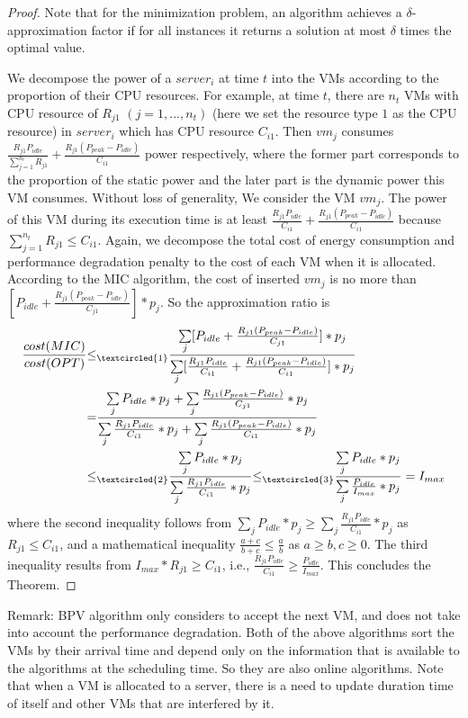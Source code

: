 \documentclass[10pt,journal]{IEEEtran}
\begin{document}
\begin{proof}
Note that for the minimization problem, an algorithm achieves a $\delta$-approximation factor if for all instances it returns a solution at most $\delta$ times the optimal value.

We decompose the power of a $server_i$ at time $t$ into the VMs according to the proportion of their CPU resources. For example, at time $t$, there are $n_t$ VMs with CPU resource of $R_{j1}$ $(j=1,...,n_t)$ (here we set the resource type $1$ as the CPU resource) in $server_i$ which has CPU resource $C_{i1}$. Then $vm_j$ consumes $\frac{R_{j1}P_{idle}}{\sum_{j=1}^{n_t}R_{j1}}+\frac{R_{j1}(P_{peak}-P_{idle})}{C_{i1}}$ power respectively, where the former part corresponds to the proportion of the static power and the later part is the dynamic power this VM consumes. Without loss of generality, We consider the VM $vm_j$. The power of this VM during its execution time is at least $\frac{R_{j1}P_{idle}}{C_{i1}}+\frac{R_{j1}(P_{peak}-P_{idle})}{C_{i1}}$ because $\sum_{j=1}^{n_t}R_{j1}{\leq}C_{i1}$. Again, we decompose the total cost of energy consumption and performance degradation penalty to the cost of each VM when it is allocated. According to the MIC algorithm, the cost of inserted $vm_j$ is no more than $[P_{idle}+\frac{R_{j1}(P_{peak}-P_{idle})}{C_{j1}}]*p_j$. So the approximation ratio is
\begin{equation*}
\begin{split}
\frac{cost(MIC)}{cost(OPT)}&{{\leq}_{\textcircled{1}}}\frac{\sum\limits_{j}[P_{idle}+\frac{R_{j1}(P_{peak}-P_{idle})}{C_{j1}}]*p_j}{\sum\limits_{j}[\frac{R_{j1}P_{idle}}{C_{i1}}+\frac{R_{j1}(P_{peak}-P_{idle})}{C_{i1}}]*p_j}\\
&{=}\frac{\sum\limits_{j}P_{idle}*p_j+\sum\limits_{j}\frac{R_{j1}(P_{peak}-P_{idle})}{C_{j1}}*p_j}{\sum\limits_{j}\frac{R_{j1}P_{idle}}{C_{i1}}*p_j+\sum\limits_{j}\frac{R_{j1}(P_{peak}-P_{idle})}{C_{i1}}*p_j}\\
&{{\leq}_{\textcircled{2}}}\frac{\sum\limits_{j}P_{idle}*p_j}{\sum\limits_{j}\frac{R_{j1}P_{idle}}{C_{i1}}*p_j}{{\leq}_{\textcircled{3}}}\frac{\sum\limits_{j}P_{idle}*p_j}{\sum\limits_{j}\frac{P_{idle}}{I_{max}}*p_j}={I_{max}}
\end{split}
\end{equation*}
where the second inequality follows from $\sum\limits_{j}P_{idle}*p_j{\geq}\sum\limits_{j}\frac{R_{j1}P_{idle}}{C_{i1}}*p_j$ as $R_{j1}{\leq}C_{i1}$, and a mathematical inequality $\frac{a+c}{b+c}{\leq}\frac{a}{b}$ as $a{\geq}b, c{\geq}0$. The third inequality results from $I_{max}*R_{j1}{\geq}C_{i1}$, i.e., $\frac{R_{j1}P_{idle}}{C_{i1}}{\geq}\frac{P_{idle}}{I_{max}}$. This concludes the Theorem.
\end{proof}
Remark: BPV algorithm only considers to accept the next VM, and does not take into account the performance degradation. Both of the above algorithms sort the VMs by their arrival time and depend only on the information that is available to the algorithms at the scheduling time. So they are also online algorithms. Note that when a VM is allocated to a server, there is a need to update duration time of itself and other VMs that are interfered by it.
\end{document}
